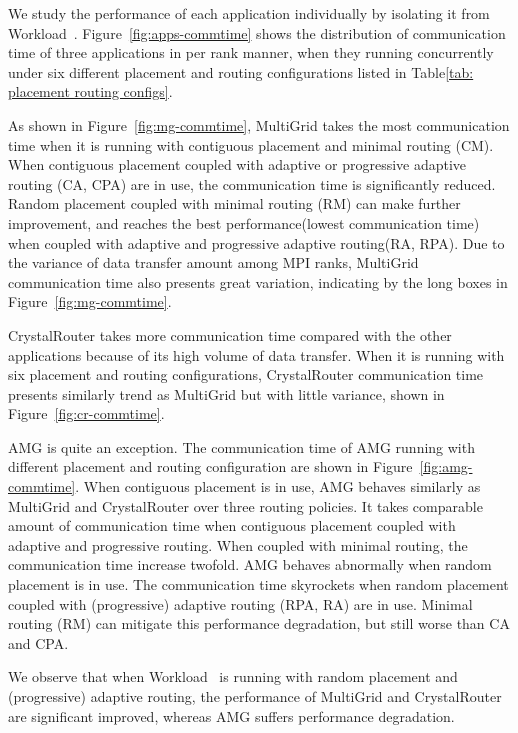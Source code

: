 We study the performance of each application individually by isolating it from Workload~.   
Figure~\ref{fig:apps-commtime} shows the distribution of communication time of three applications in per rank manner, 
when they running concurrently under six different placement and routing configurations listed in Table\ref{tab: placement routing configs}.

As shown in Figure~\ref{fig:mg-commtime}, 
MultiGrid takes the most communication time when it is running with contiguous placement and minimal routing (CM). 
When contiguous placement coupled with adaptive or progressive adaptive routing (CA, CPA) are in use, 
the communication time is significantly reduced. 
Random placement coupled with minimal routing (RM) can make further improvement, 
and reaches the best performance(lowest communication time) when coupled with adaptive and progressive adaptive routing(RA, RPA). 
Due to the variance of data transfer amount among MPI ranks, 
MultiGrid communication time also presents great variation, 
indicating by the long boxes in Figure~\ref{fig:mg-commtime}.

CrystalRouter takes more communication time compared with the other applications because of its high volume of data transfer. 
When it is running with six placement and routing configurations, 
CrystalRouter communication time presents similarly trend as MultiGrid but with little variance, shown in Figure~\ref{fig:cr-commtime}. 


AMG is quite an exception. 
The communication time of AMG running with different placement and routing configuration are shown in Figure~\ref{fig:amg-commtime}.
When contiguous placement is in use, AMG behaves similarly as MultiGrid and CrystalRouter over three routing policies. 
It takes comparable amount of communication time when contiguous placement coupled with adaptive and progressive routing. 
When coupled with minimal routing, the communication time increase twofold. 
AMG behaves abnormally when random placement is in use. 
The communication time skyrockets when random placement coupled with (progressive) adaptive routing (RPA, RA) are in use. Minimal routing (RM) can mitigate this performance degradation, but still worse than CA and CPA.

We observe that when Workload~ is running with random placement and (progressive) adaptive routing, 
the performance of MultiGrid and CrystalRouter are significant improved, whereas AMG suffers performance degradation. 


